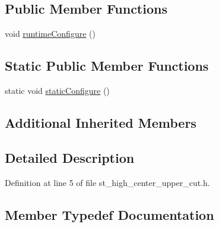 \subsection*{Public Member Functions}
\begin{DoxyCompactItemize}
\item 
void \hyperlink{structsm__moveit__3_1_1StHighCenterUpperCut_abf028817092539f6ba633e750d322bf0}{runtime\+Configure} ()
\end{DoxyCompactItemize}
\subsection*{Static Public Member Functions}
\begin{DoxyCompactItemize}
\item 
static void \hyperlink{structsm__moveit__3_1_1StHighCenterUpperCut_a4f9ebb013b2961fed72fef061e2578d8}{static\+Configure} ()
\end{DoxyCompactItemize}
\subsection*{Additional Inherited Members}


\subsection{Detailed Description}


Definition at line 5 of file st\+\_\+high\+\_\+center\+\_\+upper\+\_\+cut.\+h.



\subsection{Member Typedef Documentation}
\mbox{\label{structsm__moveit__3_1_1StHighCenterUpperCut_a91b32fdc7c44562edaaf5ff024e95505}} 

